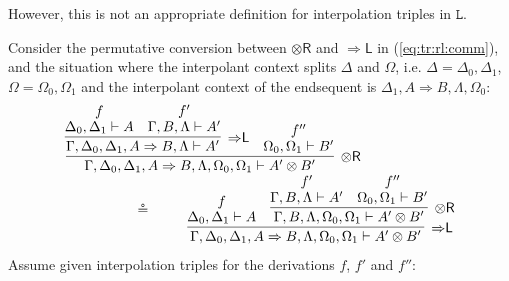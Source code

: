 \documentclass[a4paper,UKenglish,cleveref,autoref,thm-restate, anonymous]{lipics-v2021}
\newcommand{\proofbox}[1]{\begin{array}{c} #1 \end{array}}
\newcommand{\ot}{\otimes}
\newcommand{\Rarr}{\Rightarrow}
\newcommand{\GG}{\Gamma}
\newcommand{\GD}{\Delta}
\newcommand{\GL}{\Lambda}
\newcommand{\GO}{\Omega}
\renewcommand{\L}{$\mathtt{L}$}
\newcommand{\vd}{\vdash}
\newcommand{\tr}{{\otimes}\mathsf{R}}
\newcommand{\Rl}{{\Rarr}\mathsf{L}}
\newcommand{\tred}[1]{\textcolor{red}{#1}}
\begin{document}
However, this is not an appropriate definition for interpolation triples in \L.
\begin{example}
  Consider the permutative conversion between $\tr$ and $\Rl$ in (\ref{eq:tr:rl:comm}), and the situation where 
the interpolant context splits $\GD$ and $\GO$, i.e. $\GD = \GD_0 , \GD_1$, $\GO = \GO_0 , \GO_1$ and the interpolant context of the endsequent is $\GD_1 , A \Rarr B , \GL , \GO_0$:
\begin{equation}\label{eq:ct:example}
  \begin{array}{l}
    \proofbox{\infer[\tr]{\GG , \GD_0 , \GD_1 , A \Rarr B , \GL , \GO_0 , \GO_1 \vd A' \ot B'}{
    \infer[\Rl]{\GG , \GD_0 , \GD_1 , A \Rarr B , \GL \vd A'}{
      \deduce{\GD_0 , \GD_1 \vd A}{f}
      &
      \deduce{\GG , B , \GL \vd A'}{f'}
    }
    &
    \deduce{\GO_0 , \GO_1 \vd B'}{f''}
  }
  }
  \\
  \hspace*{2cm}\circeq\qquad
  \proofbox{\infer[\Rl]{\GG , \GD_0 , \GD_1 , A \Rarr B , \GL , \GO_0 , \GO_1 \vd A' \ot B'}{
    \deduce{\GD_0 , \GD_1 \vd A}{f}
    &
    \infer[\tr]{\GG , B , \GL , \GO_0, \GO_1 \vd A' \ot B'}{
      \deduce{\GG , B , \GL \vd A'}{f'}
      &
      \deduce{\GO_0 , \GO_1 \vd B'}{f''}
    }
  }
  }
  \end{array}
\end{equation}
Assume given interpolation triples for the derivations $f$, $f'$ and $f''$:

\end{example}
\end{document}
